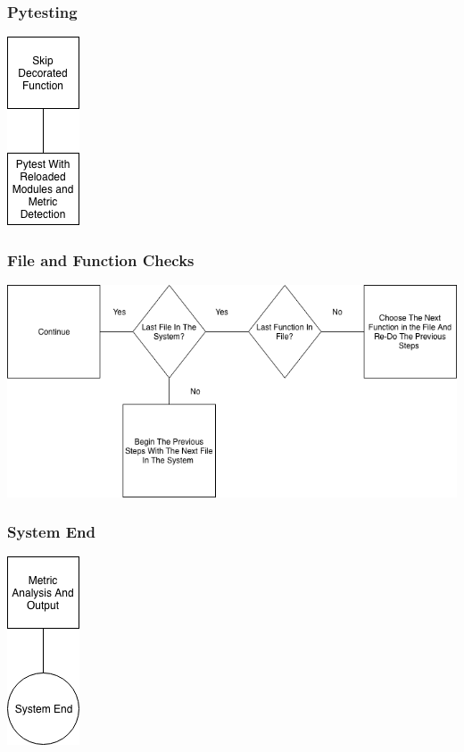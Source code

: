 \begin{frame}
  \frametitle{Pytesting}
  \begin{center}
    \includegraphics[scale = .5]{images/decoration}
  \end{center}
\end{frame}

\begin{frame}
  \frametitle{File and Function Checks}
  \begin{center}
    \includegraphics[scale = .35]{images/decisions}
  \end{center}
\end{frame}

\begin{frame}
  \frametitle{System End}
  \begin{center}
    \includegraphics[scale = .5]{images/systemEnd}
  \end{center}
\end{frame}
